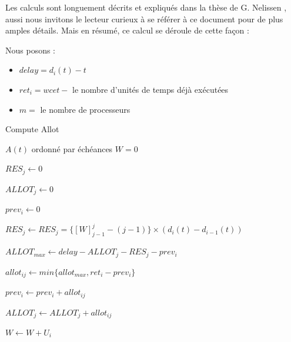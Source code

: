 	Les calculs sont longuement décrits et expliqués dans la thèse de G. Nelissen \cite{nelissen_u-edf_2012}, aussi nous invitons 
	le lecteur curieux à se référer à ce document pour de plus amples détails. Mais en résumé, 
	ce calcul se déroule de cette façon :
	
	Nous posons :
	\begin{itemize}
		\item $delay = d_i(t) - t$
		\item $ret_i = wcet - $ le nombre d'unités de temps déjà exécutées
		\item $m = $ le nombre de processeurs
	\end{itemize}
	
	\begin{algorithm}
		\caption{Compute Allot}
		\begin{algorithmic}
			\REQUIRE $A(t)$ ordonné par échéances
			\STATE $W = 0$
			
				\item $RES_j \leftarrow 0$
				\item $ALLOT_j \leftarrow 0$
			\ENDFOR

				\item $prev_i \leftarrow 0$
					\item $RES_j \leftarrow RES_j = \{[W]_{j-1}^{j} - (j - 1)\}\times (d_i(t) - d_{i-1}(t))$
					\item $ALLOT_{max} \leftarrow delay - ALLOT_j - RES_j - prev_i$
					\item $allot_{ij} \leftarrow min\{allot_{max}, ret_i - prev_i\}$
					\item $prev_i \leftarrow prev_i + allot_{ij}$
					\item $ALLOT_j \leftarrow ALLOT_j + allot_{ij}$
				\ENDFOR
				\item $W \leftarrow W + U_i$
			\ENDFOR
		\end{algorithmic}
	\end{algorithm}
	
